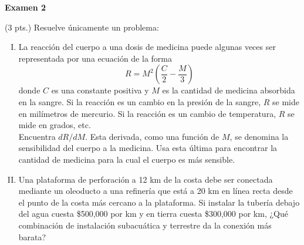 \documentclass[12pt]{exam}
\begin{document}
\centering


\Large 
\textbf{Examen 2}\\


\normalsize

\pointformat{\bfseries\boldmath(\thepoints)}
\vskip15pt

    
    \begin{questions}

     \question (3 pts.) Resuelve únicamente un problema:
 \begin{enumerate}[I)]
   \item La reacci\'on del cuerpo a una dosis de medicina puede algunas veces ser representada por una ecuaci\'on de la forma $$R=M^2(\frac{C}{2}-\frac{M}{3})$$ donde $C$ es una constante positiva y $M$ es la cantidad de medicina absorbida en la sangre. Si la reacci\'on es un cambio en la presi\'on de la sangre, $R$ se mide en mil\'imetros de mercurio. Si la reacci\'on es un cambio de temperatura, $R$ se mide en grados, etc. \\
    Encuentra $dR/dM$. Esta derivada, como una funci\'on de $M$, se denomina la sensibilidad del cuerpo a la medicina. Usa esta \'ultima para encontrar la cantidad de medicina para la cual el cuerpo es m\'as sensible. 

    \item Una plataforma de perforación a 12 km de la costa debe ser conectada mediante un oleoducto a una refinería que está a 20 km en línea recta desde el punto de la costa más cercano a la plataforma. Si instalar la tubería debajo del agua cuesta \$500,000 por km y en tierra cuesta \$300,000 por km, ¿Qué combinación de instalación subacuática y terrestre da la conexión más barata?
\end{enumerate}
    
\vskip10pt
     
\vskip10pt

  

\end{questions}
\end{document}
